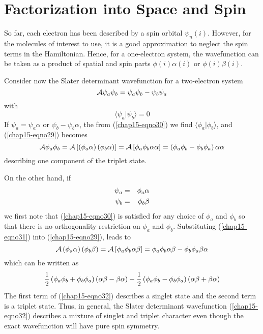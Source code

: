 \section{Factorization into Space and Spin}

So far, each electron has been described by a spin orbital 
$\psi_n(i)$.  However, for the molecules of interest to use, it is a 
good approximation to neglect the spin terms in the Hamiltonian.  Hence, 
for a one-electron system, the wavefunction can be taken as a product 
of spatial and spin parts $\phi(i)\alpha(i)$ or $\phi(i)\beta(i)$.

Consider now the Slater determinant wavefunction for a two-electron
system
\begin{equation}
{\cal A} \psi_a \psi_b = \psi_a \psi_b - \psi_b \psi_a
\label{chap15-eqno29}
\end{equation}
with
\begin{equation}
\langle \psi_a | \psi_b \rangle = 0
\label{chap15-eqno30}
\end{equation}
If $\psi_a = \psi_a\alpha$ or $\psi_b - \psi_b\alpha$, the from
(\ref{chap15-eqno30}) we find $\langle \phi_a | \phi_b \rangle$, and
(\ref{chap15-eqno29}) becomes
\begin{equation}
{\cal A} \phi_a \phi_b = {\cal A} \left[ \left( \phi_a\alpha \right) 
\left( \phi_b\alpha \right) \right] = {\cal A} \left[ \phi_a \phi_b 
\alpha \alpha \right] = \left( \phi_a \phi_b - \phi_b \phi_a \right) 
\alpha \alpha
\end{equation}
describing one component of the triplet state.

On the other hand, if
\begin{eqnarray}
\psi_a &=& \phi_a \alpha\cr
\psi_b &=& \phi_b \beta
\label{chap15-eqno31}
\end{eqnarray}
we first note that (\ref{chap15-eqno30}) is satisfied for any choice
of $\phi_a$ and $\phi_b$ so that there is no orthogonality restriction
on $\phi_a$ and $\phi_b$.  Substituting (\ref{chap15-eqno31}) into
(\ref{chap15-eqno29}), leads to
\begin{equation}
{\cal A} \left( \phi_a \alpha \right) \left( \phi_b \beta \right) = 
{\cal A} \left[ \phi_a \phi_b \alpha \beta \right] = \phi_a \phi_b 
\alpha \beta - \phi_b \phi_a \beta \alpha
\label{chap15-eqno32}
\end{equation}
which can be written as
\begin{equation}
{1 \over 2} \left( \phi_a \phi_b + \phi_b \phi_a \right) \left( \alpha 
\beta - \beta \alpha \right) - {1 \over 2} \left( \phi_a \phi_b - 
\phi_b \phi_a \right) \left( \alpha \beta + \beta \alpha \right)
\end{equation}
The first term of (\ref{chap15-eqno32}) describes a singlet state and
the second term is a triplet state.  Thus, in general, the Slater
determinant wavefunction (\ref{chap15-eqno32}) describes a mixture of
singlet and triplet character even though the exact wavefunction will
have pure spin symmetry.

